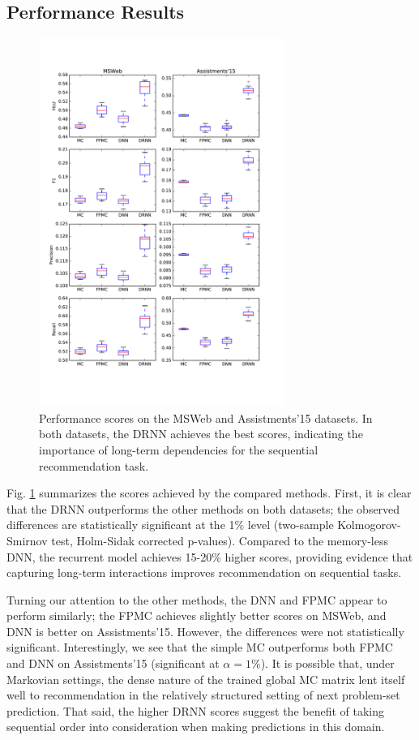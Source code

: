 \documentclass{sig-alternate-05-2015}
\begin{document}
\subsection{Performance Results}
\begin{figure}
\includegraphics[width=8cm]{images/PerfBoxplots}		
\caption{Performance scores on the MSWeb and Assistments'15 datasets. In both datasets, the DRNN achieves the best scores, indicating the importance of long-term dependencies for the sequential recommendation task.}
\label{fig:PerfResults}
\end{figure}
Fig. \ref{fig:PerfResults} summarizes the scores achieved by the compared methods. First, it is clear that the DRNN outperforms the other methods on both datasets; the observed differences are statistically significant at the 1\% level (two-sample Kolmogorov-Smirnov test, Holm-Sidak corrected p-values). Compared to the memory-less DNN, the recurrent model achieves 15-20\% higher scores, providing evidence that capturing long-term interactions improves recommendation on sequential tasks. 

Turning our attention to the other methods, the DNN and FPMC appear to perform similarly; the FPMC achieves slightly better scores on MSWeb, and DNN is better on Assistments'15. However, the differences were not statistically significant. Interestingly, we see that the simple MC outperforms both FPMC and DNN on Assistments'15 (significant at $\alpha = 1\%$). It is possible that, under Markovian settings, the dense nature of the trained global MC matrix lent itself well to recommendation in the relatively structured setting of next problem-set prediction. That said, the higher DRNN scores suggest the benefit of taking sequential order into consideration when making predictions in this domain.
\end{document}
